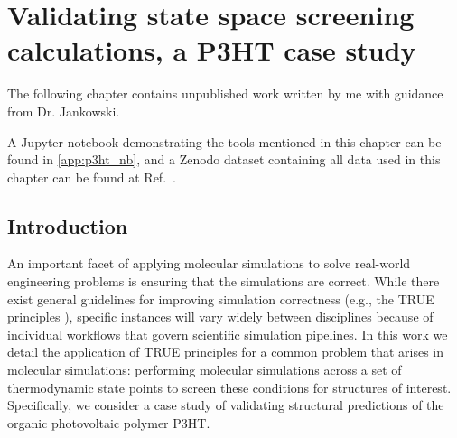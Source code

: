 \chapter{Validating state space screening calculations, a P3HT case study}
\label{chap:p3ht_validation}

The following chapter contains unpublished work written by me with guidance from Dr. Jankowski.

A Jupyter notebook demonstrating the tools mentioned in this chapter can be found in \autoref{app:p3ht_nb}, and a Zenodo dataset containing all data used in this chapter can be found at Ref.~\citet{Fothergill2022}.

\section{Introduction}

An important facet of applying molecular simulations to solve real-world engineering problems is ensuring that the simulations are correct.
While there exist general guidelines for improving simulation correctness (e.g., the TRUE principles \cite{Thompson2020}), specific instances will vary widely between disciplines because of individual workflows that govern scientific simulation pipelines. 
In this work we detail the application of TRUE principles for a common problem that arises in molecular simulations: performing molecular simulations across a set of thermodynamic state points to screen these conditions for structures of interest. 
Specifically, we consider a case study of validating structural predictions of the organic photovoltaic polymer P3HT. 

